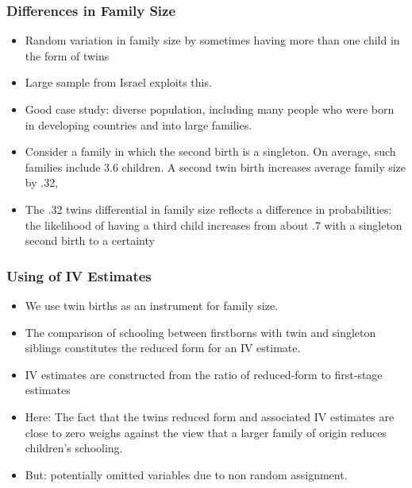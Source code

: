 \documentclass{beamer}
\begin{document}

\begin{frame}
\frametitle{Differences in Family Size}

\begin{itemize}
	\item Random variation in family size by sometimes having more than one child in the form of twins
	\item Large sample from Israel exploits this.
	\item Good case study: diverse population, including many people who were born in developing countries and into large families.
	\item Consider a family in which the second birth is a singleton. On average, such families include 3.6 children. A second twin birth increases average family size by .32,
	\item The .32 twins differential in family size reflects a difference in probabilities: the likelihood of having a third child increases from about .7 with a singleton second birth to a certainty
\end{itemize}

\end{frame}


\begin{frame}
\frametitle{Using of IV Estimates}
\begin{itemize}
	\item We use twin births as an instrument for family size.
	\item The comparison of schooling between firstborns with twin and singleton siblings constitutes the reduced form for an IV estimate.
	\item IV estimates are constructed from the ratio of reduced-form to first-stage estimates
	\item Here: The fact that the twins reduced form and associated IV estimates are close to zero weighs against the view that a larger family of origin reduces children’s schooling.
	\item But: potentially omitted variables due to non random assignment.
\end{itemize}

\end{frame}

\end{document}

